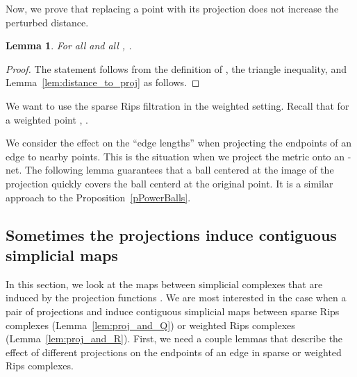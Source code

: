 \documentclass[a4paper]{article}
\newtheorem{lemma}[theorem]{Lemma}
\begin{document}
Now, we prove that replacing a point with its projection does not increase the perturbed distance.
  \begin{lemma}\label{lem:distances_dont_grow}
    For all  and all , .\qedhere
  \end{lemma}
  \begin{proof}
    The statement follows from the definition of , the triangle inequality, and Lemma~\ref{lem:distance_to_proj} as follows.
    
  \end{proof}

We want to use the sparse Rips filtration in the weighted setting. 
Recall that for a weighted point , .

We consider the effect on the ``edge lengths'' when projecting the endpoints of an edge to nearby points.
This is the situation when we project the metric onto an -net. 
The following lemma guarantees that a ball centered at the image of the projection quickly covers the ball centerd at the original point.
It is a similar approach to the Proposition~\ref{pPowerBalls}.
  
\begin{center}
\end{center}






\subsection{Sometimes the projections induce contiguous simplicial maps} \label{sub:sometimes_the_projections_induce_contiguous_simplicial_maps}

  In this section, we look at the maps between simplicial complexes that are induced by the projection functions .
  We are most interested in the case when a pair of projections  and  induce contiguous simplicial maps between sparse Rips complexes (Lemma~\ref{lem:proj_and_Q}) or weighted Rips complexes (Lemma~\ref{lem:proj_and_R}).
  First, we need a couple lemmas that describe the effect of different projections on the endpoints of an edge in sparse or weighted Rips complexes.
\end{document}
